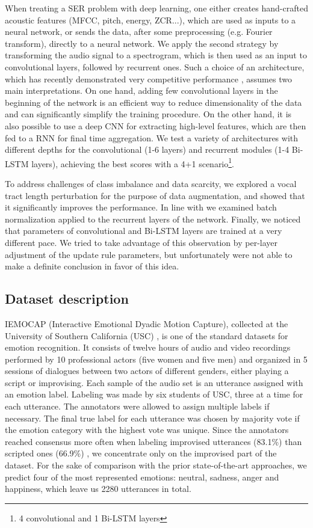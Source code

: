 \documentclass[a4paper]{article}
\begin{document}
When treating a SER problem with deep learning, one either creates hand-crafted acoustic features (MFCC, pitch, energy, ZCR...), which are used as inputs to a 
neural network, or sends the data, after some preprocessing (e.g. Fourier transform), directly to a neural network. We apply the second strategy by transforming 
the audio signal to a spectrogram, which is then used as an input to convolutional layers, followed by recurrent ones. Such a choice of an architecture, 
which has recently demonstrated very competitive performance \cite{clstm,Baidu,tspredictor}, assumes two main interpretations. On one hand, adding few convolutional 
layers in the beginning of the network is an efficient way to reduce dimensionality of the data and can significantly simplify the training procedure. On the other hand, 
it is also possible to use a deep CNN for extracting high-level features, which are then fed to a RNN for final time aggregation. We test a variety of architectures 
with different depths for the convolutional (1-6 layers) and recurrent modules (1-4 Bi-LSTM layers), achieving the best scores with a 4+1 scenario\footnote{4 convolutional 
and 1 Bi-LSTM layers}. 

To address challenges of class imbalance and data scarcity, we explored a vocal tract length perturbation for the purpose
of data augmentation, and showed that it significantly improves the performance.
In line with \cite{BNrecNN,Baidu,RBN,LN} we examined batch normalization applied to the recurrent layers of the network. Finally, we noticed that parameters of convolutional and Bi-LSTM layers are trained at a very different pace. 
We tried to take advantage of this observation by per-layer adjustment of the update rule parameters, but unfortunately were not able to make a definite conclusion in favor of this idea.

\subsection{Dataset description}
\label{datadescription}
IEMOCAP (Interactive Emotional Dyadic Motion Capture), collected at the University of Southern California (USC) \cite{Busso2008}, is
one of the standard datasets for emotion recognition. It consists of twelve hours of audio and video recordings performed by 10 professional actors (five women and five men) and organized in 5 sessions of dialogues between two actors of different genders, either playing a script or improvising. 
Each sample of the audio set is an utterance assigned with an emotion label. Labeling was made by six students of USC, three at a time for each utterance. 
The annotators were allowed to assign multiple labels if necessary. The final true label for each utterance was chosen by majority vote if the emotion 
category with the highest vote was unique. 
Since the annotators reached consensus more often when labeling improvised utterances (83.1\%) than scripted 
ones (66.9\%) \cite{Busso2008}, we concentrate only on the improvised part of the dataset. For the sake of comparison with the prior state-of-the-art approaches, 
we predict four of the most represented emotions: neutral, sadness, anger and happiness, which leave us 2280 utterances in total.
\end{document}
